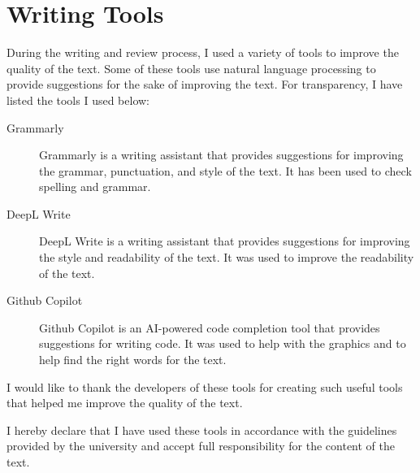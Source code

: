 \documentclass[../paper.tex]{subfiles}
\begin{document}
    \section*{Writing Tools}
    During the writing and review process, I used a variety of tools to improve the quality of the text. Some of these tools use natural language processing to provide suggestions for the sake of improving the text. For transparency, I have listed the tools I used below:
    \begin{description}
        \item[Grammarly] Grammarly is a writing assistant that provides suggestions for improving the grammar, punctuation, and style of the text. It has been used to check spelling and grammar.
        \item[DeepL Write] DeepL Write is a writing assistant that provides suggestions for improving the style and readability of the text. It was used to improve the readability of the text.
        \item[Github Copilot] Github Copilot is an AI-powered code completion tool that provides suggestions for writing code. It was used to help with the graphics and to help find the right words for the text.
    \end{description}

    I would like to thank the developers of these tools for creating such useful tools that helped me improve the quality of the text.

    I hereby declare that I have used these tools in accordance with the guidelines provided by the university and accept full responsibility for the content of the text.

    \ifSubfilesClassLoaded{%
        \printbibliography{}%
    }{}
\end{document}
